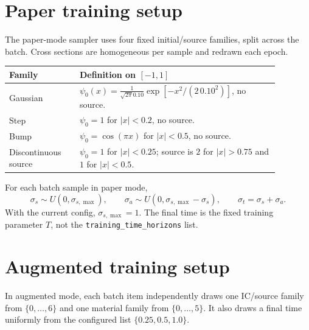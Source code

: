 \documentclass[10pt]{article}
\begin{document}
\section*{Paper training setup}
The paper-mode sampler uses four fixed initial/source families, split across the batch. Cross sections are homogeneous per sample and redrawn each epoch.

\begin{center}
\begin{tabular}{p{0.23\linewidth} p{0.65\linewidth}}
\toprule
Family & Definition on \([-1,1]\) \\
\midrule
Gaussian & \(\psi_0(x)=\frac{1}{\sqrt{2\pi}0.10}\exp[-x^2/(2\,0.10^2)]\), no source. \\
Step & \(\psi_0=1\) for \(|x|<0.2\), no source. \\
Bump & \(\psi_0=\cos(\pi x)\) for \(|x|<0.5\), no source. \\
Discontinuous source & \(\psi_0=1\) for \(|x|<0.25\); source is \(2\) for \(|x|>0.75\) and \(1\) for \(|x|<0.5\). \\
\bottomrule
\end{tabular}
\end{center}

For each batch sample in paper mode,
\[
  \sigma_s \sim U(0,\sigma_{s,\max}), \qquad
  \sigma_a \sim U(0,\sigma_{s,\max}-\sigma_s), \qquad
  \sigma_t = \sigma_s + \sigma_a.
\]
With the current config, \(\sigma_{s,\max}=1\). The final time is the fixed training parameter \(T\), not the \texttt{training\_time\_horizons} list.

\section*{Augmented training setup}
In augmented mode, each batch item independently draws one IC/source family from \(\{0,\ldots,6\}\) and one material family from \(\{0,\ldots,5\}\). It also draws a final time uniformly from the configured list \(\{0.25,0.5,1.0\}\).
\end{document}
